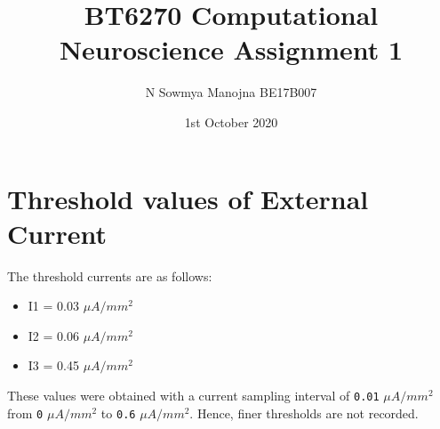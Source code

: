 \documentclass[12pt,a4paper]{article}
\author{\vspace{-4em}N Sowmya Manojna BE17B007\vspace{-4em}}
\date{1st October 2020}
\title{\vspace{-3em}BT6270 Computational Neuroscience Assignment 1}
\newcommand{\noi}{\noindent}
\def\tt#1{\texttt{#1}}
\begin{document}
		
	    
		

\vspace{-1em}
\maketitle
\vspace{-3em}

\section{Threshold values of External Current}
The threshold currents are as follows:
\vspace{-0.5em}
\begin{itemize}
	\itemsep0em
	\item I1 = 0.03 $\mu A/mm^2$
	\item I2 = 0.06 $\mu A/mm^2$
	\item I3 = 0.45 $\mu A/mm^2$
\end{itemize}

\noi
These values were obtained with a current sampling interval of \tt{0.01}  $\mu A/mm^2$ from \tt{0} $\mu A/mm^2$ to \tt{0.6} $\mu A/mm^2$. Hence, finer thresholds are not recorded.
\end{document}
